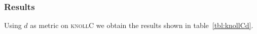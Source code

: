 \documentclass{article}
\newcommand{\vect}[1]{\ensuremath{\boldsymbol{\mathbf{#1}}}\xspace}
\newcommand{\knollC}{\textsc{knollC}\xspace}
\begin{document}


\subsubsection{Results}
Using $d$ as metric on \knollC we obtain the results shown in table~\ref{tbl:knollCd}.
\end{document}
